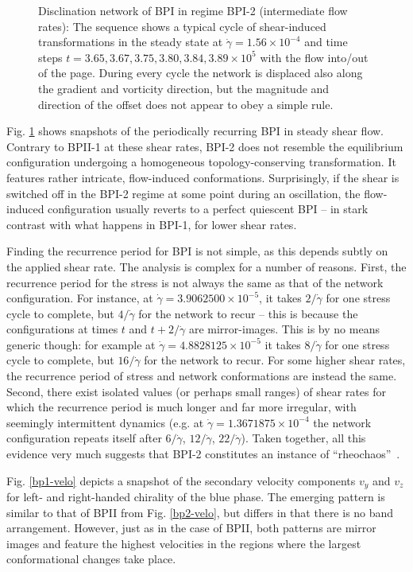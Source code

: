 \documentclass[aps,pre,reprint,superscriptaddress, twocolumn]{revtex4}
\newcommand{\e}[1]{\times10^{#1}}
\newcommand{\gd}{\dot{\gamma}}
\begin{document}
\begin{figure}[htpb]
\caption{Disclination network of BPI in regime BPI-2 (intermediate flow rates): 
The sequence shows a typical cycle of shear-induced transformations in the 
steady state at $\gd=1.56\e{-4}$ and time steps 
$t=3.65, 3.67,3.75,3.80,3.84,3.89\e{5}$ with the flow into/out of the page. 
During every cycle the network is displaced also along the gradient and vorticity direction, 
but the magnitude and direction of the offset does not appear to obey a 
simple rule.}
\label{bp1-med}
\end{figure}


Fig. \ref{bp1-med} shows snapshots of the periodically recurring 
BPI in steady shear flow. Contrary to BPII-1 at these shear rates, 
BPI-2 does not resemble the equilibrium configuration
undergoing a homogeneous topology-conserving 
transformation. It features rather intricate, flow-induced 
conformations. Surprisingly, if the shear is switched off in
the BPI-2 regime at some point during an oscillation, 
the flow-induced configuration usually
reverts to a perfect quiescent BPI -- in stark contrast with
what happens in BPI-1, for lower shear rates. 

Finding the recurrence period for BPI is not simple, as
this depends subtly on the applied shear rate. The analysis is complex for
a number of reasons. 
First, the recurrence period for the stress is not always the same as
that of the network configuration. 
For instance, at $\gd=3.9062500\e{-5}$, it takes $2/\gd$ for one
 stress cycle to complete, but $4/\gd$ for the network to recur --
this is because the configurations at times $t$ and $t+2/\gd$ are 
mirror-images. This is by no means generic though: for example
at $\gd=4.8828125\e{-5}$  it takes $8/\gd$ for one
stress cycle to complete, but $16/\gd$ for the network to recur. 
For some higher shear rates, the recurrence period of stress
and network conformations are instead the same.
Second, there exist isolated values (or perhaps small ranges) of shear
rates for which the recurrence period is much longer and far more irregular,
with seemingly intermittent dynamics (e.g. at $\gd=1.3671875\e{-4}$ the
network configuration repeats itself after $6/\gd$, $12/\gd$, $22/\gd$).
Taken together, all this evidence very much suggests that 
BPI-2 constitutes an instance of ``rheochaos''~\cite{rheochaos}.

Fig. \ref{bp1-velo} depicts a snapshot of the secondary velocity 
components $v_y$ and $v_z$ for left- and right-handed chirality of
the blue phase. The emerging pattern is similar to that of BPII from 
Fig. \ref{bp2-velo}, but differs in that there is no band
arrangement. However, just as in the case of BPII, both patterns
are mirror images and feature the highest velocities in the regions where 
the largest conformational changes take place. 
\end{document}

